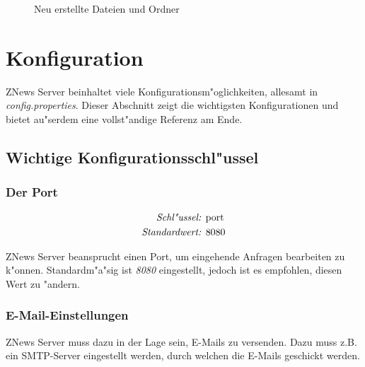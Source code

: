 \begin{figure}[htb]
    \caption{\label{fig:dirtree2}Neu erstellte Dateien und Ordner}
\end{figure}

\pagebreak
\section{Konfiguration}%
\label{sec:config}

ZNews Server beinhaltet viele Konfigurationsm"oglichkeiten,
allesamt in \emph{config.properties}.
Dieser Abschnitt zeigt die wichtigsten Konfigurationen
und bietet au"serdem eine vollst"andige Referenz am Ende.

\subsection{Wichtige Konfigurationsschl"ussel}

\subsubsection{Der Port} \label{sec:config:port}

\begin{align*}
    \emph{Schl"ussel: } & \lstinline{port}\\
    \emph{Standardwert: } & \lstinline{8080}
\end{align*}

ZNews Server beansprucht einen Port, um eingehende
Anfragen bearbeiten zu k"onnen. Standardm"a"sig ist
\emph{8080} eingestellt, jedoch ist es empfohlen,
diesen Wert zu "andern.

\subsubsection{E-Mail-Einstellungen}

ZNews Server muss dazu in der Lage sein, E-Mails
zu versenden. Dazu muss z.B. ein SMTP-Server eingestellt
werden, durch welchen die E-Mails geschickt werden.

